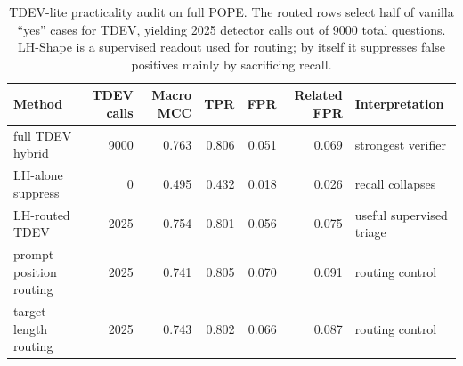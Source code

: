 \begin{table}[t]
\centering
\small
\setlength{\tabcolsep}{4.0pt}
\begin{tabular}{lrrrrrl}
\toprule
Method & TDEV calls & Macro MCC & TPR & FPR & Related FPR & Interpretation \\
\midrule
full TDEV hybrid & 9000 & 0.763 & 0.806 & 0.051 & 0.069 & strongest verifier \\
LH-alone suppress & 0 & 0.495 & 0.432 & 0.018 & 0.026 & recall collapses \\
LH-routed TDEV & 2025 & 0.754 & 0.801 & 0.056 & 0.075 & useful supervised triage \\
prompt-position routing & 2025 & 0.741 & 0.805 & 0.070 & 0.091 & routing control \\
target-length routing & 2025 & 0.743 & 0.802 & 0.066 & 0.087 & routing control \\
\bottomrule
\end{tabular}
\caption{TDEV-lite practicality audit on full POPE. The routed rows select half of vanilla ``yes'' cases for TDEV, yielding 2025 detector calls out of 9000 total questions. LH-Shape is a supervised readout used for routing; by itself it suppresses false positives mainly by sacrificing recall.}
\label{tab:appendix-tdev-lite}
\end{table}

